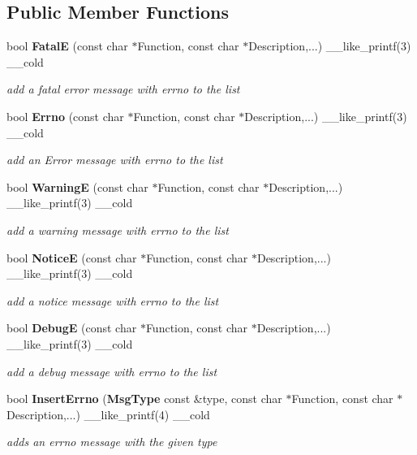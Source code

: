 \subsection*{\-Public \-Member \-Functions}
\begin{DoxyCompactItemize}
\item 
bool {\bf \-Fatal\-E} (const char $\ast$\-Function, const char $\ast$\-Description,...) \-\_\-\-\_\-like\-\_\-printf(3) \-\_\-\-\_\-cold
\begin{DoxyCompactList}\small\item\em add a fatal error message with errno to the list \end{DoxyCompactList}\item 
bool {\bf \-Errno} (const char $\ast$\-Function, const char $\ast$\-Description,...) \-\_\-\-\_\-like\-\_\-printf(3) \-\_\-\-\_\-cold
\begin{DoxyCompactList}\small\item\em add an \-Error message with errno to the list \end{DoxyCompactList}\item 
bool {\bf \-Warning\-E} (const char $\ast$\-Function, const char $\ast$\-Description,...) \-\_\-\-\_\-like\-\_\-printf(3) \-\_\-\-\_\-cold
\begin{DoxyCompactList}\small\item\em add a warning message with errno to the list \end{DoxyCompactList}\item 
bool {\bf \-Notice\-E} (const char $\ast$\-Function, const char $\ast$\-Description,...) \-\_\-\-\_\-like\-\_\-printf(3) \-\_\-\-\_\-cold
\begin{DoxyCompactList}\small\item\em add a notice message with errno to the list \end{DoxyCompactList}\item 
bool {\bf \-Debug\-E} (const char $\ast$\-Function, const char $\ast$\-Description,...) \-\_\-\-\_\-like\-\_\-printf(3) \-\_\-\-\_\-cold
\begin{DoxyCompactList}\small\item\em add a debug message with errno to the list \end{DoxyCompactList}\item 
bool {\bf \-Insert\-Errno} ({\bf \-Msg\-Type} const \&type, const char $\ast$\-Function, const char $\ast$\-Description,...) \-\_\-\-\_\-like\-\_\-printf(4) \-\_\-\-\_\-cold
\begin{DoxyCompactList}\small\item\em adds an errno message with the given type \end{DoxyCompactList}\item 

\end{DoxyCompactItemize}
